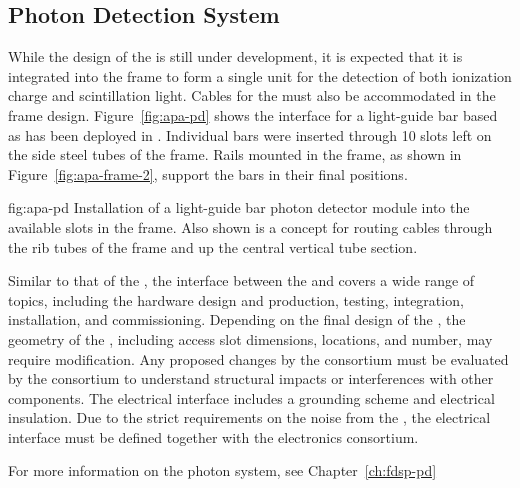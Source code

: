 \subsection{Photon Detection System}
\label{sec:fdsp-apa-intfc-pds}

While the design of the  is still under development, it is expected that it is integrated into the  frame to form a single unit for the detection of both ionization charge and scintillation light.  Cables for the  must also be accommodated in the  frame design.  Figure~\ref{fig:apa-pd} shows the interface for a light-guide bar based  as has been deployed in . Individual bars were inserted through \num{10} slots left on the side steel tubes of the frame. Rails mounted in the  frame, as shown in Figure~\ref{fig:apa-frame-2}, support the bars in their final positions. 

\begin{dunefigure}{fig:apa-pd}
{Installation of a light-guide bar photon detector module into the available slots in the  frame. Also shown is a concept for routing  cables through the rib tubes of the  frame and up the central vertical tube section.}
\end{dunefigure}

Similar to that of the , the interface between the  and  covers a wide range of topics, including the hardware design and production, testing, integration, installation, and commissioning. Depending on the final design of the , the geometry of the , including access slot dimensions, locations, and number, may require modification. Any proposed changes by the  consortium must be evaluated by the  consortium to understand structural impacts or interferences with other components.  The electrical interface includes a grounding scheme and electrical insulation. Due to the strict requirements on the noise from the , the electrical interface must be defined together with the \single electronics consortium. 

For more information on the photon system, see Chapter~\ref{ch:fdsp-pd} %


